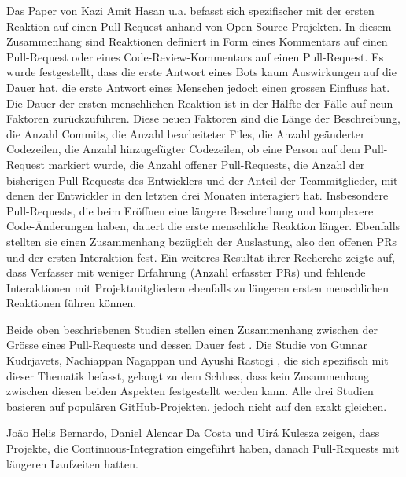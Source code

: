 Das Paper von Kazi Amit Hasan u.a.\parencite{hasan_understanding_2023} befasst sich spezifischer mit der ersten Reaktion auf einen Pull-Request anhand von Open-Source-Projekten. In diesem Zusammenhang sind Reaktionen definiert in Form eines Kommentars auf einen Pull-Request oder eines Code-Review-Kommentars auf einen Pull-Request. Es wurde festgestellt, dass die erste Antwort eines Bots kaum Auswirkungen auf die Dauer hat, die erste Antwort eines Menschen jedoch einen grossen Einfluss hat. Die Dauer der ersten menschlichen Reaktion ist in der Hälfte der Fälle auf neun Faktoren zurückzuführen. Diese neuen Faktoren sind die Länge der Beschreibung, die Anzahl Commits, die Anzahl bearbeiteter Files, die Anzahl geänderter Codezeilen, die Anzahl hinzugefügter Codezeilen,  ob eine Person auf dem Pull-Request markiert wurde, die Anzahl offener Pull-Requests, die Anzahl der bisherigen Pull-Requests des Entwicklers und der Anteil der Teammitglieder, mit denen der Entwickler in den letzten drei Monaten interagiert hat. Insbesondere Pull-Requests, die beim Eröffnen eine längere Beschreibung und komplexere Code-Änderungen haben, dauert die erste menschliche Reaktion länger. Ebenfalls stellten sie einen Zusammenhang bezüglich der Auslastung, also den offenen PRs und der ersten Interaktion fest. Ein weiteres Resultat ihrer Recherche zeigte auf, dass Verfasser mit weniger Erfahrung (Anzahl erfasster PRs) und fehlende Interaktionen mit Projektmitgliedern ebenfalls zu längeren ersten menschlichen Reaktionen führen können.\parencite{hasan_understanding_2023} 

Beide oben beschriebenen Studien stellen einen Zusammenhang zwischen der Grösse eines Pull-Requests und dessen Dauer fest \parencite{yu_wait_2015}\parencite{hasan_understanding_2023}. Die Studie von Gunnar Kudrjavets, Nachiappan Nagappan und Ayushi Rastogi  \parencite{kudrjavets_small_2022}, die sich spezifisch mit dieser Thematik befasst, gelangt zu dem Schluss, dass kein Zusammenhang zwischen diesen beiden Aspekten festgestellt werden kann. Alle drei Studien basieren auf populären GitHub-Projekten, jedoch nicht auf den exakt gleichen.

João Helis Bernardo, Daniel Alencar Da Costa und Uirá Kulesza \parencite{bernardo_studying_2018} zeigen, dass Projekte, die Continuous-Integration eingeführt haben, danach Pull-Requests mit längeren Laufzeiten hatten.


